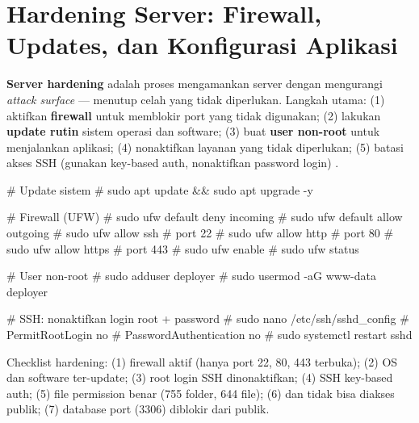 \section{Hardening Server: Firewall, Updates, dan Konfigurasi Aplikasi}

\textbf{Server hardening} adalah proses mengamankan server dengan mengurangi \textit{attack surface} --- menutup celah yang tidak diperlukan. Langkah utama: (1) aktifkan \textbf{firewall} untuk memblokir port yang tidak digunakan; (2) lakukan \textbf{update rutin} sistem operasi dan software; (3) buat \textbf{user non-root} untuk menjalankan aplikasi; (4) nonaktifkan layanan yang tidak diperlukan; (5) batasi akses SSH (gunakan key-based auth, nonaktifkan password login) \cite{phpRightWay}.

\begin{webcode}[language=PHP, caption={Perintah hardening server dasar (Ubuntu/Debian)}]
# Update sistem
# sudo apt update && sudo apt upgrade -y

# Firewall (UFW)
# sudo ufw default deny incoming
# sudo ufw default allow outgoing
# sudo ufw allow ssh       # port 22
# sudo ufw allow http      # port 80
# sudo ufw allow https     # port 443
# sudo ufw enable
# sudo ufw status

# User non-root
# sudo adduser deployer
# sudo usermod -aG www-data deployer

# SSH: nonaktifkan login root + password
# sudo nano /etc/ssh/sshd_config
# PermitRootLogin no
# PasswordAuthentication no
# sudo systemctl restart sshd
\end{webcode}

\begin{catatan}
Checklist hardening: (1) firewall aktif (hanya port 22, 80, 443 terbuka); (2) OS dan software ter-update; (3) root login SSH dinonaktifkan; (4) SSH key-based auth; (5) file permission benar (755 folder, 644 file); (6)  dan  tidak bisa diakses publik; (7) database port (3306) diblokir dari publik.
\end{catatan}

